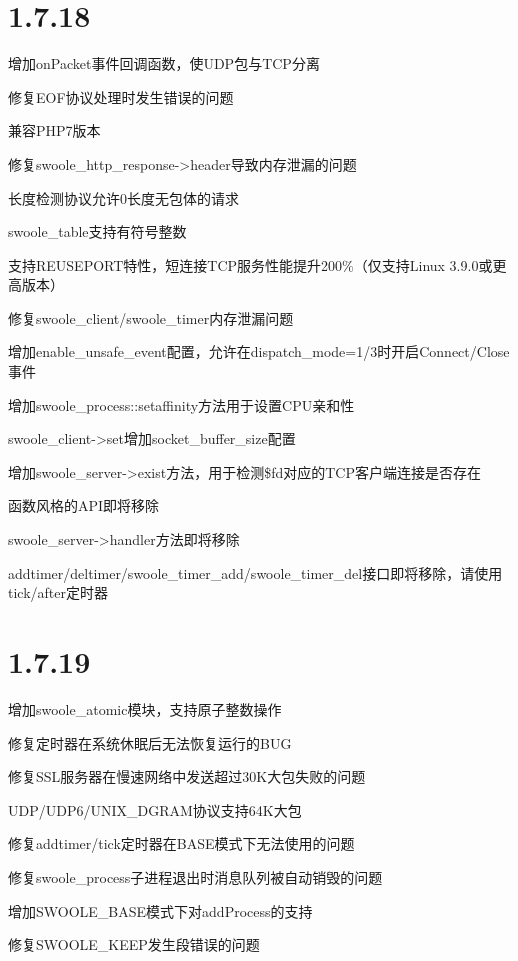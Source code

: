 \section{1.7.18}


\begin{compactitem}
\item 增加onPacket事件回调函数，使UDP包与TCP分离
\item 修复EOF协议处理时发生错误的问题
\item 兼容PHP7版本
\item 修复swoole\_http\_response->header导致内存泄漏的问题
\item 长度检测协议允许0长度无包体的请求
\item swoole\_table支持有符号整数
\item 支持REUSEPORT特性，短连接TCP服务性能提升200\%（仅支持Linux 3.9.0或更高版本）
\item 修复swoole\_client/swoole\_timer内存泄漏问题
\item 增加enable\_unsafe\_event配置，允许在dispatch\_mode=1/3时开启Connect/Close事件
\item 增加swoole\_process::setaffinity方法用于设置CPU亲和性
\item swoole\_client->set增加socket\_buffer\_size配置
\item 增加swoole\_server->exist方法，用于检测\$fd对应的TCP客户端连接是否存在
\item 函数风格的API即将移除
\item swoole\_server->handler方法即将移除
\item addtimer/deltimer/swoole\_timer\_add/swoole\_timer\_del接口即将移除，请使用tick/after定时器
\end{compactitem}


\section{1.7.19}



\begin{compactitem}
\item 增加swoole\_atomic模块，支持原子整数操作
\item 修复定时器在系统休眠后无法恢复运行的BUG
\item 修复SSL服务器在慢速网络中发送超过30K大包失败的问题
\item UDP/UDP6/UNIX\_DGRAM协议支持64K大包
\item 修复addtimer/tick定时器在BASE模式下无法使用的问题
\item 修复swoole\_process子进程退出时消息队列被自动销毁的问题
\item 增加SWOOLE\_BASE模式下对addProcess的支持
\item 修复SWOOLE\_KEEP发生段错误的问题
\end{compactitem}



